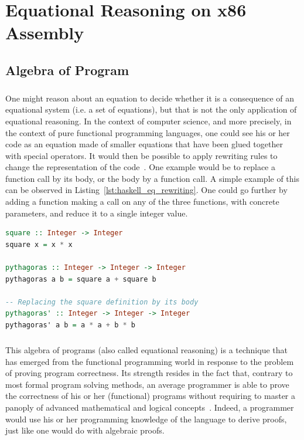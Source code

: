 \chapter{Equational Reasoning on x86 Assembly} \label{chapter:equational_reasoning}
\section{Algebra of Program} \label{sec:algebra_of_program}
\paragraph{}
One might reason about an equation to decide whether it is a consequence of an equational system (i.e. a set of equations), but that is not the only application of equational reasoning. In the context of computer science, and more precisely, in the context of pure functional programming languages, one could see his or her code as an equation made of smaller equations that have been glued together with special operators. It would then be possible to apply rewriting rules to change the representation of the code~\cite{htfet1980equations}. One example would be to replace a function call by its body, or the body by a function call. A simple example of this can be observed in Listing~\ref{lst:haskell_eq_rewriting}. One could go further by adding a function making a call on any of the three functions, with concrete parameters, and reduce it to a single integer value. \\

\begin{lstlisting}[caption={Example of equational reasoning in Haskell.}, label={lst:haskell_eq_rewriting}, frame=tlrb, language={Haskell}]
square :: Integer -> Integer
square x = x * x

pythagoras :: Integer -> Integer -> Integer
pythagoras a b = square a + square b

-- Replacing the square definition by its body
pythagoras' :: Integer -> Integer -> Integer
pythagoras' a b = a * a + b * b
\end{lstlisting}

\paragraph{}
This algebra of programs (also called equational reasoning) is a technique that has emerged from the functional programming world in response to the problem of proving program correctness. Its strength resides in the fact that, contrary to most formal program solving methods, an average programmer is able to prove the correctness of his or her (functional) programs without requiring to master a panoply of advanced mathematical and logical concepts~\cite{backus1978can}. Indeed, a programmer would use his or her programming knowledge of the language to derive proofs, just like one would do with algebraic proofs.

